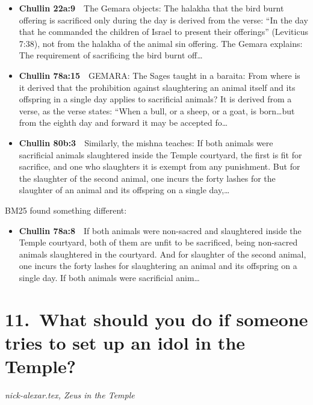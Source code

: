 \documentclass[11pt,a4paper]{article}
\begin{document}
\begin{itemize}[leftmargin=1.2em,itemsep=3pt]
\item {\color{ref}\textbf{Chullin 22a:9}}\ \ The Gemara objects: The halakha that the bird burnt offering is sacrificed only during the day is derived from the verse: “In the day that he commanded the children of Israel to present their offerings” (Leviticus 7:38), not from the halakha of the animal sin offering. The Gemara explains: The requirement of sacrificing the bird burnt off\ldots
\item {\color{ref}\textbf{Chullin 78a:15}}\ \ GEMARA: The Sages taught in a baraita: From where is it derived that the prohibition against slaughtering an animal itself and its offspring in a single day applies to sacrificial animals? It is derived from a verse, as the verse states: “When a bull, or a sheep, or a goat, is born…but from the eighth day and forward it may be accepted fo\ldots
\item {\color{ref}\textbf{Chullin 80b:3}}\ \ Similarly, the mishna teaches: If both animals were sacrificial animals slaughtered inside the Temple courtyard, the first is fit for sacrifice, and one who slaughters it is exempt from any punishment. But for the slaughter of the second animal, one incurs the forty lashes for the slaughter of an animal and its offspring on a single day,\ldots
\end{itemize}
{\color{quiet}\small BM25 found something different:}
\begin{itemize}[leftmargin=1.2em]
\item {\color{ref}\textbf{Chullin 78a:8}}\ \ If both animals were non-sacred and slaughtered inside the Temple courtyard, both of them are unfit to be sacrificed, being non-sacred animals slaughtered in the courtyard. And for slaughter of the second animal, one incurs the forty lashes for slaughtering an animal and its offspring on a single day. If both animals were sacrificial anim\ldots
\end{itemize}

\section*{11.\ What should you do if someone tries to set up an idol in the Temple?}
{\color{quiet}\small\textit{nick-alexar.tex, Zeus in the Temple}}
\end{document}
